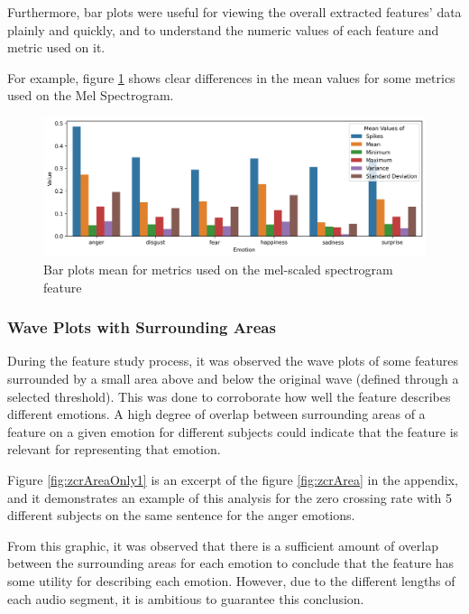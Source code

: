 Furthermore, bar plots were useful for viewing the overall extracted features' data plainly and quickly, and to understand the numeric values of each feature and metric used on it.

For example, figure \ref{fig:melBarPlot} shows clear differences in the mean values for some metrics used on the Mel Spectrogram.

\begin{figure}[H]
	\centering
	\includegraphics[width=\textwidth]{figs/4_1_traditional/meanFeatBarPlot.png}
	\caption{Bar plots mean for metrics used on the mel-scaled spectrogram feature}
	\label{fig:melBarPlot}
\end{figure}


\subsubsection{Wave Plots with Surrounding Areas}

During the feature study process, it was observed the wave plots of some features surrounded by a small area above and below the original wave (defined through a selected threshold). This was done to corroborate how well the feature describes different emotions. A high degree of overlap between surrounding areas of a feature on a given emotion for different subjects could indicate that the feature is relevant for representing that emotion.

Figure \ref{fig:zcrAreaOnly1} is an excerpt of the figure \ref{fig:zcrArea} in the appendix, and it demonstrates an example of this analysis for the zero crossing rate with 5 different subjects on the same sentence for the anger emotions.

From this graphic, it was observed that there is a sufficient amount of overlap between the surrounding areas for each emotion to conclude that the feature has some utility for describing each emotion. However, due to the different lengths of each audio segment, it is ambitious to guarantee this conclusion.

